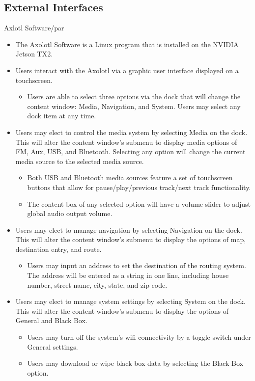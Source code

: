 \documentclass[onecolumn, draftclsnofoot,10pt, compsoc]{IEEEtran}
\begin{document}
\subsection{External Interfaces}
Axlotl Software/par
\begin{itemize}
	\item The Axolotl Software is a Linux program that is installed on the NVIDIA Jetson TX2.
	\item Users interact with the Axolotl via a graphic user interface displayed on a touchscreen.
	\begin{itemize}
		\item Users are able to select three options via the dock that will change the content window: Media, Navigation, and System. Users may select any dock item at any time.
	\end{itemize}
	\item Users may elect to control the media system by selecting Media on the dock. This will alter the content window’s submenu to display media options of FM, Aux, USB, and Bluetooth. Selecting any option will change the current media source to the selected media source.
	\begin{itemize}
		\item Both USB and Bluetooth media sources feature a set of touchscreen buttons that allow for pause/play/previous track/next track functionality.
		\item The content box of any selected option will have a volume slider to adjust global audio output volume.
	\end{itemize}
	\item Users may elect to manage navigation by selecting Navigation on the dock. This will alter the content window’s submenu to display the options of map, destination entry, and route.
	\begin{itemize}
		\item Users may input an address to set the destination of the routing system. The address will be entered as a string in one line, including house number, street name, city, state, and zip code.
	\end{itemize}
	\item Users may elect to manage system settings by selecting System on the dock. This will alter the content window’s submenu to display the options of General and Black Box.
	\begin{itemize}
		\item Users may turn off the system’s wifi connectivity by a toggle switch under General settings.
		\item Users may download or wipe black box data by selecting the Black Box option.
	\end{itemize}
\end{itemize}
\end{document}
